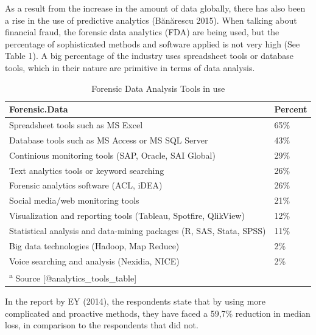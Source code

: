 \documentclass[12pt,]{article}
\begin{document}
As a result from the increase in the amount of data globally, there has
also been a rise in the use of predictive analytics (Bănărescu 2015).
When talking about financial fraud, the forensic data analytics (FDA)
are being used, but the percentage of sophisticated methods and software
applied is not very high (See Table 1). A big percentage of the industry
uses spreadsheet tools or database tools, which in their nature are
primitive in terms of data analysis.

\begin{table}

\caption{\label{tab:table analytics}Forensic Data Analysis Tools in use}
\centering
\fontsize{8}{10}\selectfont
\begin{tabular}[t]{ll}
\toprule
Forensic.Data & Percent\\
\midrule
Spreadsheet tools such as MS Excel & 65\%\\
Database tools such as MS Access or MS SQL Server & 43\%\\
Continious monitoring tools  (SAP, Oracle, SAI Global) & 29\%\\
Text analytics tools or keyword searching & 26\%\\
Forensic analytics software (ACL, iDEA) & 26\%\\
\addlinespace
Social media/web monitoring tools & 21\%\\
Visualization and reporting tools (Tableau, Spotfire,                                                     QlikView) & 12\%\\
Statistical analysis and data-mining packages (R,                                                        SAS, Stata, SPSS) & 11\%\\
Big data technologies (Hadoop, Map Reduce) & 2\%\\
Voice searching and analysis (Nexidia, NICE) & 2\%\\
\bottomrule
\multicolumn{2}{l}{\textsuperscript{a} Source [@analytics\_tools\_table]}\\
\end{tabular}
\end{table}

In the report by EY (2014), the respondents state that by using more
complicated and proactive methods, they have faced a 59,7\% reduction in
median loss, in comparison to the respondents that did not.
\end{document}
